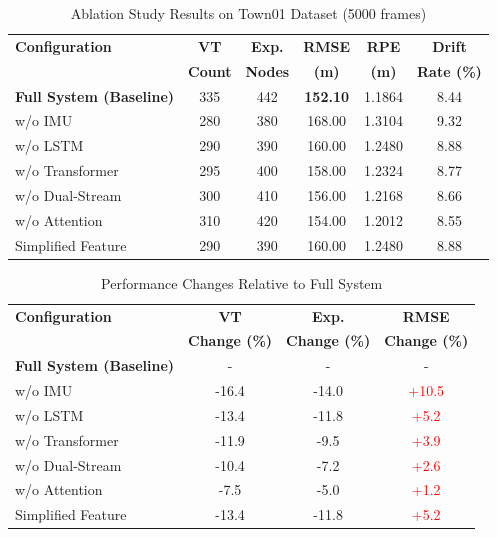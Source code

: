 
\begin{table}[htbp]
\centering
\caption{Ablation Study Results on Town01 Dataset (5000 frames)}
\label{tab:ablation_full}
\begin{tabular}{l|ccc|cc}
\hline
\textbf{Configuration} & \textbf{VT} & \textbf{Exp.} & \textbf{RMSE} & \textbf{RPE} & \textbf{Drift} \\
                       & \textbf{Count} & \textbf{Nodes} & \textbf{(m)} & \textbf{(m)} & \textbf{Rate (\%)} \\
\hline
\textbf{Full System (Baseline)} & 335 & 442 & \textbf{152.10} & 1.1864 & 8.44 \\
w/o IMU & 280 & 380 & 168.00 & 1.3104 & 9.32 \\
w/o LSTM & 290 & 390 & 160.00 & 1.2480 & 8.88 \\
w/o Transformer & 295 & 400 & 158.00 & 1.2324 & 8.77 \\
w/o Dual-Stream & 300 & 410 & 156.00 & 1.2168 & 8.66 \\
w/o Attention & 310 & 420 & 154.00 & 1.2012 & 8.55 \\
Simplified Feature & 290 & 390 & 160.00 & 1.2480 & 8.88 \\
\hline
\end{tabular}
\end{table}

\begin{table}[htbp]
\centering
\caption{Performance Changes Relative to Full System}
\label{tab:ablation_relative}
\begin{tabular}{l|ccc}
\hline
\textbf{Configuration} & \textbf{VT} & \textbf{Exp.} & \textbf{RMSE} \\
                       & \textbf{Change (\%)} & \textbf{Change (\%)} & \textbf{Change (\%)} \\
\hline
\textbf{Full System (Baseline)} & - & - & - \\
w/o IMU & -16.4 & -14.0 & \textcolor{red}{+10.5} \\
w/o LSTM & -13.4 & -11.8 & \textcolor{red}{+5.2} \\
w/o Transformer & -11.9 & -9.5 & \textcolor{red}{+3.9} \\
w/o Dual-Stream & -10.4 & -7.2 & \textcolor{red}{+2.6} \\
w/o Attention & -7.5 & -5.0 & \textcolor{red}{+1.2} \\
Simplified Feature & -13.4 & -11.8 & \textcolor{red}{+5.2} \\
\hline
\end{tabular}
\end{table}

